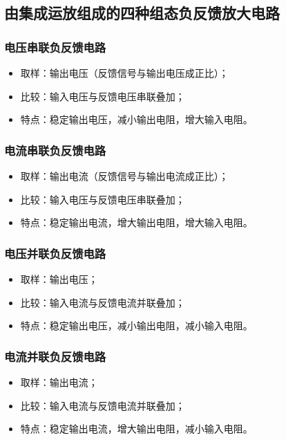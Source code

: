\subsection{由集成运放组成的四种组态负反馈放大电路}
\subsubsection{电压串联负反馈电路}
\begin{itemize}
    \item 取样：输出电压（反馈信号与输出电压成正比）；
    \item 比较：输入电压与反馈电压串联叠加；
    \item 特点：稳定输出电压，减小输出电阻，增大输入电阻。
\end{itemize}

\subsubsection{电流串联负反馈电路}
\begin{itemize}
    \item 取样：输出电流（反馈信号与输出电流成正比）；
    \item 比较：输入电压与反馈电压串联叠加；
    \item 特点：稳定输出电流，增大输出电阻，增大输入电阻。
\end{itemize}

\subsubsection{电压并联负反馈电路}
\begin{itemize}
    \item 取样：输出电压；
    \item 比较：输入电流与反馈电流并联叠加；
    \item 特点：稳定输出电压，减小输出电阻，减小输入电阻。
\end{itemize}

\subsubsection{电流并联负反馈电路}
\begin{itemize}
    \item 取样：输出电流；
    \item 比较：输入电流与反馈电流并联叠加；
    \item 特点：稳定输出电流，增大输出电阻，减小输入电阻。
\end{itemize}

